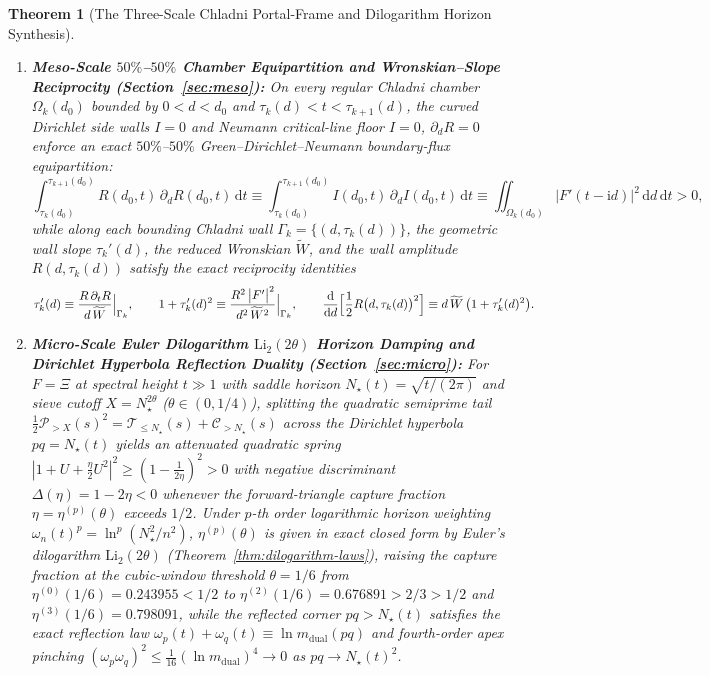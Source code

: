 \documentclass[11pt,reqno]{amsart}
\newtheorem{theorem}{Theorem}[section]
\theoremstyle{definition}
\theoremstyle{remark}
\numberwithin{equation}{section}
\newcommand{\dd}{\mathrm{d}}
\newcommand{\ii}{\mathrm{i}}
\newcommand{\Li}{\mathrm{Li}}
\newcommand{\dual}{\mathrm{dual}}
\begin{document}
\begin{theorem}[The Three-Scale Chladni Portal-Frame and Dilogarithm Horizon Synthesis]
\begin{enumerate}[label=\upshape(\Roman*),leftmargin=2.4em]
\item \textbf{Meso-Scale $50\%$--$50\%$ Chamber Equipartition and Wronskian--Slope Reciprocity (Section~\ref{sec:meso}):} On every regular Chladni chamber $\Omega_k(d_0)$ bounded by $0 < d < d_0$ and $\tau_k(d) < t < \tau_{k+1}(d)$, the curved Dirichlet side walls $I=0$ and Neumann critical-line floor $I=0$, $\partial_d R=0$ enforce an exact $50\%$--$50\%$ Green--Dirichlet--Neumann boundary-flux equipartition:
\begin{equation}\label{eq:equipartition-intro}
\int_{\tau_k(d_0)}^{\tau_{k+1}(d_0)} R(d_0,t)\,\partial_d R(d_0,t)\,\dd t \equiv \int_{\tau_k(d_0)}^{\tau_{k+1}(d_0)} I(d_0,t)\,\partial_d I(d_0,t)\,\dd t \equiv \iint_{\Omega_k(d_0)} \bigl|F'(t-\ii d)\bigr|^2\,\dd d\,\dd t > 0,
\end{equation}
while along each bounding Chladni wall $\Gamma_k = \{(d,\tau_k(d))\}$, the geometric wall slope $\tau_k'(d)$, the reduced Wronskian $\widetilde{W}$, and the wall amplitude $R(d,\tau_k(d))$ satisfy the exact reciprocity identities
\begin{equation}\label{eq:reciprocity-intro}
\tau_k'(d) \equiv \frac{R\,\partial_t R}{d\,\widetilde{W}}\Big|_{\Gamma_k}, \qquad 1 + \tau_k'(d)^2 \equiv \frac{R^2\,\bigl|F'\bigr|^2}{d^2\,\widetilde{W}^2}\Big|_{\Gamma_k}, \qquad \frac{\dd}{\dd d}\Bigl[\frac{1}{2}R\bigl(d,\tau_k(d)\bigr)^2\Bigr] \equiv d\,\widetilde{W}\,\bigl(1 + \tau_k'(d)^2\bigr).
\end{equation}
\item \textbf{Micro-Scale Euler Dilogarithm $\Li_2(2\theta)$ Horizon Damping and Dirichlet Hyperbola Reflection Duality (Section~\ref{sec:micro}):} For $F=\Xi$ at spectral height $t \gg 1$ with saddle horizon $N_\star(t)=\sqrt{t/(2\pi)}$ and sieve cutoff $X = N_\star^{2\theta}$ ($\theta \in (0,1/4)$), splitting the quadratic semiprime tail $\frac{1}{2}\mathcal{P}_{>X}(s)^2 = \mathcal{T}_{\le N_\star}(s) + \mathcal{C}_{>N_\star}(s)$ across the Dirichlet hyperbola $pq = N_\star(t)$ yields an attenuated quadratic spring $|1 + U + \frac{\eta}{2}U^2|^2 \ge (1 - \frac{1}{2\eta})^2 > 0$ with negative discriminant $\Delta(\eta) = 1 - 2\eta < 0$ whenever the forward-triangle capture fraction $\eta = \eta^{(p)}(\theta)$ exceeds $1/2$. Under $p$-th order logarithmic horizon weighting $\omega_n(t)^p = \ln^p(N_\star^2/n^2)$, $\eta^{(p)}(\theta)$ is given in exact closed form by Euler's dilogarithm $\Li_2(2\theta)$ (Theorem~\ref{thm:dilogarithm-laws}), raising the capture fraction at the cubic-window threshold $\theta=1/6$ from $\eta^{(0)}(1/6)=0.243955 < 1/2$ to $\eta^{(2)}(1/6) = 0.676891 > 2/3 > 1/2$ and $\eta^{(3)}(1/6) = 0.798091$, while the reflected corner $pq > N_\star(t)$ satisfies the exact reflection law $\omega_p(t)+\omega_q(t) \equiv \ln m_{\dual}(pq)$ and fourth-order apex pinching $(\omega_p\omega_q)^2 \le \frac{1}{16}(\ln m_{\dual})^4 \to 0$ as $pq \to N_\star(t)^2$.
\end{enumerate}
\end{theorem}
\end{document}
